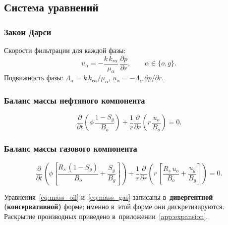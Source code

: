 \documentclass[12pt,a4paper]{article}
\newcommand{\divr}[1]{\frac{1}{r}\frac{\partial}{\partial r}\!\left(r\,#1\right)}
\newcommand{\pdt}[1]{\frac{\partial #1}{\partial t}}
\newcommand{\pdr}[1]{\frac{\partial #1}{\partial r}}
\begin{document}
\subsection{Система уравнений}\label{ssec:equations}

\subsubsection{Закон Дарси}

Скорости фильтрации для каждой фазы:
\begin{equation}\label{eq:darcy}
  \boxed{
    u_\alpha = -\frac{k\,k_{r\alpha}}{\mu_\alpha}\,\pdr{p},
    \qquad \alpha \in \{o, g\}.
  }
\end{equation}
Подвижность фазы:
$\Lambda_\alpha = k\,k_{r\alpha}/\mu_\alpha$,
\quad $u_\alpha = -\Lambda_\alpha\,\partial p/\partial r$.


\subsubsection{Баланс массы нефтяного компонента}\label{sssec:mass_oil}

\begin{equation}\label{eq:mass_oil}
  \boxed{
    \pdt{}\!\left(\phi\,\frac{1 - S_g}{B_o}\right)
    + \divr{\frac{u_o}{B_o}} = 0.
  }
\end{equation}


\subsubsection{Баланс массы газового компонента}\label{sssec:mass_gas}

\begin{equation}\label{eq:mass_gas}
  \boxed{
    \pdt{}\!\left(\phi\!\left[
      \frac{R_s\,(1 - S_g)}{B_o} + \frac{S_g}{B_g}
    \right]\right)
    + \divr{\left[
      \frac{R_s\,u_o}{B_o} + \frac{u_g}{B_g}
    \right]} = 0.
  }
\end{equation}

Уравнения~\eqref{eq:mass_oil} и~\eqref{eq:mass_gas} записаны
в~\textbf{дивергентной (консервативной)} форме; именно в~этой форме
они дискретизируются. Раскрытие производных приведено
в~приложении~\ref{app:expansion}.
\end{document}
